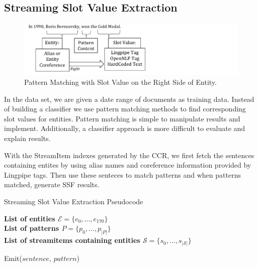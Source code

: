 \subsection{Streaming Slot Value Extraction}
\label{sec:ssve}
\begin{figure}
\centering
\includegraphics[width = 13cm]{./images/Pattern-crop.pdf}
\vspace*{-.1in} \caption{Pattern Matching with Slot Value on the Right Side of Entity. }\label{fig:pattern}
\vspace*{-.2in}
\end{figure}

In the data set, we are given a date range of documents as training data. Instead of building a classifier we use pattern matching methods to find corresponding slot values for entities. 
Pattern matching is simple to manipulate results and implement. Additionally, a classifier approach is more difficult to evaluate and explain results.

With the StreamItem indexes generated by the CCR, we first fetch the sentences containing entites by using alias names and coreference information provided by Lingpipe tags. Then use these senteces to match patterns and when patterns matched, generate SSF results.

\begin{algorithm}
  \caption{Streaming Slot Value Extraction Pseudocode}
  \textbf{List of entities $\mathcal{E} = \{e_0, \ldots, e_{170}\}$}\\
  \textbf{List of patterns $P = \{p_0, \ldots, p_{|P|}\}$}\\
  \textbf{List of streamitems containing entities $\mathcal{S} = \{s_0, \ldots, s_{|\mathcal{S}|}\}$}\\
  
  \begin{algorithmic}%
                \STATE Emit($sentence$, $pattern$)
              \ENDIF
	    \ENDFOR
          \ENDIF
        \ENDFOR
      \ENDFOR
    \ENDFOR
  \end{algorithmic}
\end{algorithm}


